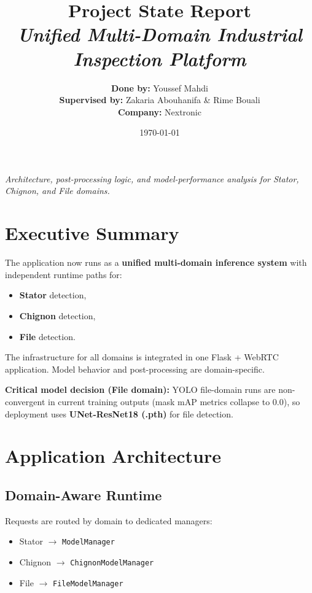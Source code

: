 \documentclass[12pt,a4paper]{article}
\title{
    \vspace*{1.2cm}
    \Huge \textbf{Project State Report} \\
    \vspace{0.4cm}
    \LARGE \textit{Unified Multi-Domain Industrial Inspection Platform} \\
    \vspace{0.8cm}
}
\author{
    \Large \textbf{Done by:} Youssef Mahdi \\
    \vspace{0.3cm}
    \Large \textbf{Supervised by:} Zakaria Abouhanifa \& Rime Bouali \\
    \vspace{0.6cm}
    \Large \textbf{Company:} Nextronic
}
\date{\today}
\begin{document}
\begin{titlepage}
    \maketitle
    \thispagestyle{empty}
    \vfill
    \begin{center}
        \large \textit{Architecture, post-processing logic, and model-performance analysis for Stator, Chignon, and File domains.}
    \end{center}
\end{titlepage}

\tableofcontents
\newpage

\section{Executive Summary}

The application now runs as a \textbf{unified multi-domain inference system} with independent runtime paths for:
\begin{itemize}
    \item \textbf{Stator} detection,
    \item \textbf{Chignon} detection,
    \item \textbf{File} detection.
\end{itemize}

The infrastructure for all domains is integrated in one Flask + WebRTC application. Model behavior and post-processing are domain-specific.

\textbf{Critical model decision (File domain):}
YOLO file-domain runs are non-convergent in current training outputs (mask mAP metrics collapse to 0.0), so deployment uses \textbf{UNet-ResNet18 (.pth)} for file detection.

\section{Application Architecture}

\subsection{Domain-Aware Runtime}

Requests are routed by domain to dedicated managers:
\begin{itemize}
    \item Stator $\rightarrow$ \texttt{ModelManager}
    \item Chignon $\rightarrow$ \texttt{ChignonModelManager}
    \item File $\rightarrow$ \texttt{FileModelManager}
\end{itemize}
\end{document}
